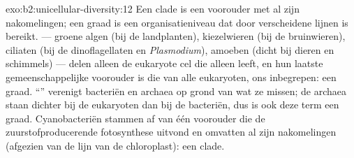 \begin{solution}{exo:b2:unicellular-diversity:12}
Een clade is een voorouder met al zijn nakomelingen; een graad is een
organisatieniveau dat door verscheidene lijnen is bereikt.  ---
groene algen (bij de landplanten), kiezelwieren (bij de bruinwieren),
ciliaten (bij de dinoflagellaten en \emph{Plasmodium}), amoeben (dicht
bij dieren en schimmels) --- delen alleen de eukaryote cel die alleen
leeft, en hun laatste gemeenschappelijke voorouder is die van alle
eukaryoten, ons inbegrepen: een graad. ``'' verenigt bacteriën
en archaea op grond van wat ze missen; de archaea staan dichter bij de
eukaryoten dan bij de bacteriën, dus is ook deze term een graad.
Cyanobacteriën stammen af van één voorouder die de zuurstofproducerende
fotosynthese uitvond en omvatten al zijn nakomelingen (afgezien van de
lijn van de chloroplast): een clade.
\end{solution}

